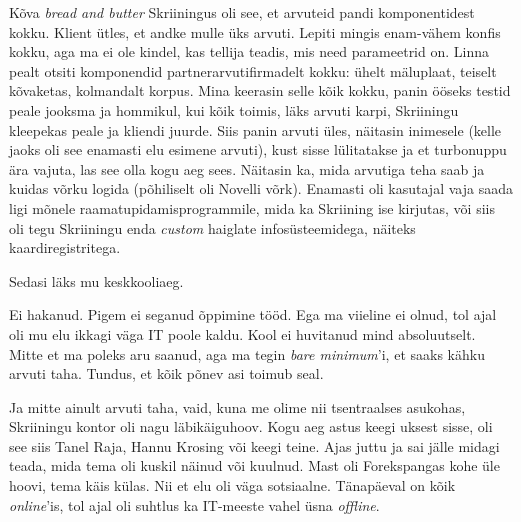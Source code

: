 Kõva \emph{bread and butter} Skriiningus oli see, et arvuteid pandi 
komponentidest kokku. Klient ütles, et andke mulle üks arvuti. Lepiti 
mingis enam-vähem konfis kokku, aga ma ei ole kindel, kas
tellija teadis, mis need parameetrid on. Linna pealt otsiti komponendid 
partnerarvutifirmadelt kokku: ühelt mäluplaat, teiselt kõvaketas, 
kolmandalt korpus. Mina keerasin selle kõik kokku, panin ööseks 
testid peale jooksma ja hommikul, kui kõik toimis, läks arvuti karpi, Skriiningu 
kleepekas peale ja kliendi juurde. Siis panin arvuti üles, näitasin inimesele (kelle 
jaoks oli see enamasti elu esimene arvuti), kust sisse 
lülitatakse ja et turbonuppu ära vajuta, las see olla kogu aeg sees. Näitasin ka, mida arvutiga teha saab ja kuidas 
võrku logida (põhiliselt oli Novelli võrk). Enamasti oli 
kasutajal vaja saada ligi mõnele raamatupidamisprogrammile, mida ka 
Skriining ise kirjutas, või siis oli tegu Skriiningu enda \emph{custom} 
haiglate infosüsteemidega, näiteks kaardiregistritega.

Sedasi läks mu keskkooliaeg. 


Ei hakanud. Pigem ei seganud õppimine tööd. Ega ma viieline ei 
olnud, tol ajal oli mu elu ikkagi väga IT poole kaldu. 
Kool ei huvitanud mind absoluutselt. Mitte et ma poleks
aru saanud, aga ma tegin \emph{bare minimum}'i, et saaks kähku arvuti taha. Tundus, et 
kõik põnev asi toimub seal. 

Ja mitte ainult arvuti taha, vaid, kuna me olime nii tsentraalses asukohas, 
Skriiningu kontor oli nagu läbikäiguhoov. Kogu aeg astus keegi uksest 
sisse, oli see siis Tanel Raja, Hannu 
Krosing või keegi teine. Ajas juttu ja sai jälle 
midagi teada, mida tema oli kuskil näinud või kuulnud. Mast oli Forekspangas kohe üle hoovi, tema käis külas. Nii et elu oli väga 
sotsiaalne. Tänapäeval on kõik \emph{online}'is, tol 
ajal oli suhtlus ka IT-meeste vahel üsna \emph{offline}. 


